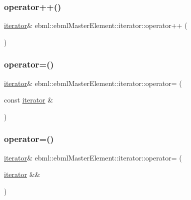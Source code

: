 \subsubsection{\texorpdfstring{operator++()}{operator++()}}
{\footnotesize\ttfamily \mbox{\hyperlink{classebml_1_1ebmlMasterElement_1_1iterator}{iterator}}\& ebml\+::ebml\+Master\+Element\+::iterator\+::operator++ (\begin{DoxyParamCaption}{ }\end{DoxyParamCaption})}

\mbox{\label{classebml_1_1ebmlMasterElement_1_1iterator_a162e7b8f1e830065d05b632314afb28a}} 
\subsubsection{\texorpdfstring{operator=()}{operator=()}\hspace{0.1cm}{\footnotesize\ttfamily [1/2]}}
{\footnotesize\ttfamily \mbox{\hyperlink{classebml_1_1ebmlMasterElement_1_1iterator}{iterator}}\& ebml\+::ebml\+Master\+Element\+::iterator\+::operator= (\begin{DoxyParamCaption}\item[{const \mbox{\hyperlink{classebml_1_1ebmlMasterElement_1_1iterator}{iterator}} \&}]{ }\end{DoxyParamCaption})}

\mbox{\label{classebml_1_1ebmlMasterElement_1_1iterator_a91f28b49e638ea9fa9c5ea5a6807e567}} 
\subsubsection{\texorpdfstring{operator=()}{operator=()}\hspace{0.1cm}{\footnotesize\ttfamily [2/2]}}
{\footnotesize\ttfamily \mbox{\hyperlink{classebml_1_1ebmlMasterElement_1_1iterator}{iterator}}\& ebml\+::ebml\+Master\+Element\+::iterator\+::operator= (\begin{DoxyParamCaption}\item[{\mbox{\hyperlink{classebml_1_1ebmlMasterElement_1_1iterator}{iterator}} \&\&}]{ }\end{DoxyParamCaption})}

